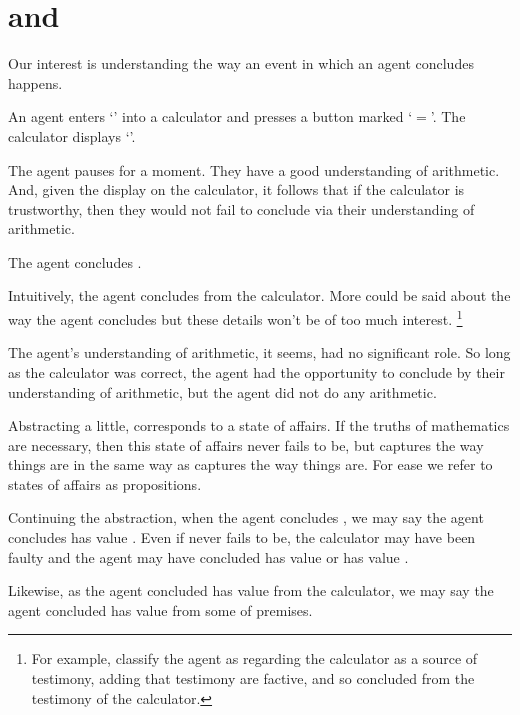 \chapter{\qWhy{} and \qHow{}}
\label{cha:intro}

\begin{note}
  Our interest is understanding the way an event in which an agent concludes happens.

  \begin{scenario}[Calculation]%
    \label{scen:calc}%
    An agent enters `\gistCalcLHS{}' into a calculator and presses a button marked `\(=\)'.
    The calculator displays `\gistCalcRHS{}'.

    The agent pauses for a moment.
    They have a good understanding of arithmetic.
    And, given the display on the calculator, it follows that if the calculator is trustworthy, then they would not fail to conclude \propM{\gistCalcEq{}} via their understanding of arithmetic.

    The agent concludes \propM{\gistCalcEq{}}.
  \end{scenario}

  \noindent%
  Intuitively, the agent concludes \propM{\gistCalcEq{}} from the calculator.
  More could be said about the way the agent concludes but these details won't be of too much interest.%
  \footnote{
    For example, classify the agent as regarding the calculator as a source of testimony, adding that testimony are factive, and so concluded \propM{\gistCalcEq{}} from the testimony of the calculator.
  }

  The agent's understanding of arithmetic, it seems, had no significant role.
  So long as the calculator was correct, the agent had the opportunity to conclude \propM{\gistCalcEq{}} by their understanding of arithmetic, but the agent did not do any arithmetic.
\end{note}

\begin{note}
  Abstracting a little, \propM{\gistCalcEq{}} corresponds to a state of affairs.
  If the truths of mathematics are necessary, then this state of affairs never fails to be, but \propM{\gistCalcEq{}} captures the way things are in the same way as  captures the way things are.
  For ease we refer to states of affairs as propositions.

  Continuing the abstraction, when the agent concludes \propM{\gistCalcEq{}}, we may say the agent concludes \propM{\gistCalcEq{}} has value .
  Even if \propM{\gistCalcEq{}} never fails to be, the calculator may have been faulty and the agent may have concluded \propM{\gistCalcEqBad{}} has value  or \propM{\gistCalcEq{}} has value .

  Likewise, as the agent concluded \propM{\gistCalcEq{}} has value  from the calculator, we may say the agent concluded \propM{\gistCalcEq{}} has value  from some \pool{} of premises.
\end{note}

